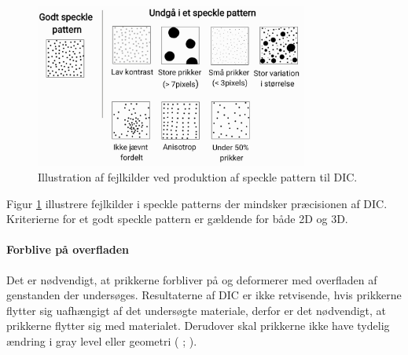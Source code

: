 \begin{figure}[H]
  \centering
    \includegraphics[width=0.8\textwidth]{Sections/2 Problemanalyse/Media/Speckle pattern.jpg}
    \caption{Illustration af fejlkilder ved produktion af speckle pattern til DIC.}
    \label{fig:godt speckle pattern}
\end{figure}

Figur \ref{fig:godt speckle pattern} illustrere fejlkilder i speckle patterns der mindsker præcisionen af DIC. Kriterierne for et godt speckle pattern er gældende for både 2D og 3D.


\paragraph{Forblive på overfladen} Det er nødvendigt, at prikkerne forbliver på og deformerer med overfladen af genstanden der undersøges. Resultaterne af DIC er ikke retvisende, hvis prikkerne flytter sig uafhængigt af det undersøgte materiale, derfor er det nødvendigt, at prikkerne flytter sig med materialet. Derudover skal prikkerne ikke have tydelig ændring i gray level eller geometri
(\cite{Dong2017ACorrelation} ; \cite{Zaya2023ApplicationReview}).

 


